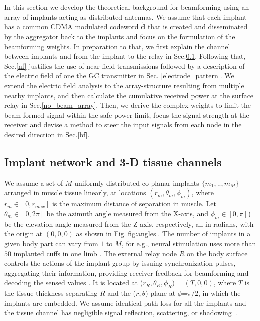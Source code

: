 In this section we develop the theoretical background for beamforming using an array of implants acting as distributed antennas. We assume that each implant has a common CDMA modulated codeword $\tilde{\mathbf{d}}$ that is created and disseminated by the aggregator back to the implants and focus on the formulation of the beamforming weights. In preparation to that, we first explain the channel between implants and from the implant to the relay in Sec.\ref{channel}. Following that, Sec.\ref{nf} justifies the use of near-field transmissions followed by a description of the electric field of one the GC transmitter in Sec. \ref{electrode_pattern}. We extend the electric field analysis to the array-structure resulting from multiple nearby implants, and then calculate the cumulative received power at the surface relay in Sec.\ref{no_beam_array}. Then, we derive the complex weights to limit the beam-formed signal within the safe power limit, focus the signal strength at the receiver and devise a method to steer the input signals from each node in the desired direction in Sec.\ref{bf}.

\subsection{Implant network and 3-D tissue channels} \label{channel}
We assume a set of $M$ uniformly distributed co-planar implants $\{m_1,..,m_M\}$ arranged in muscle tissue linearly, at locations $(r_m,\theta_m,\phi_m)$, where $r_m\in[0,r_{max}]$ is the maximum distance of separation in muscle. Let $\theta_m\in [0,2\pi]$ be the azimuth angle measured from the X-axis, and $\phi_m\in[0,\pi]$) be the elevation angle measured from the Z-axis, respectively, all in radians, with the origin at $(0,0,0)$ as shown in Fig.\ref{fig:angles}. The number of implants in a given body part can vary from $1$ to $M$, for e.g., neural stimulation uses more than $50$ implanted cuffs in one limb \cite{cyborgs,arrayelectrodes}. The external relay node $R$ on the body surface controls the actions of the implant-group by issuing synchronization pulses, aggregating their information, providing receiver feedback for beamforming and decoding the sensed values \cite{infocom}. It is located at ($r_R,\theta_R,\phi_R)=(T, 0,0)$, where $T$ is the tissue thickness separating $R$ and the ($r,\theta$) plane at $\phi$=$\pi/2$, in which the implants are embedded. We assume identical path loss for all the implants and the tissue channel has negligible signal reflection, scattering, or shadowing~\cite{tbiocas}.


